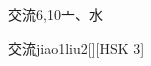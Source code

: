 \begin{entry}{交流}{6,10}{⼇、⽔}
  \begin{phonetics}{交流}{jiao1liu2}[][HSK 3]
  \end{phonetics}
\end{entry}
